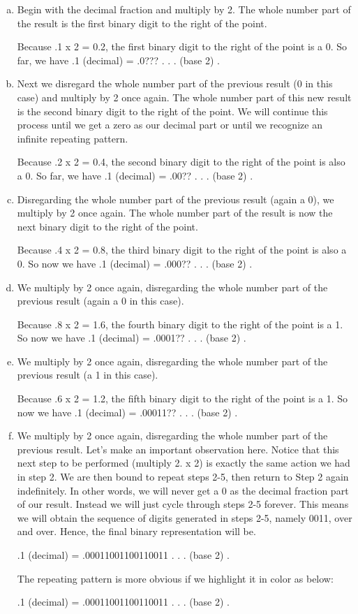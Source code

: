 \documentclass[11pt]{article}
\begin{document}
\begin{enumerate}[(a)]
\item
Begin with the decimal fraction and multiply by 2. The whole number
part of the result is the first binary digit to the right of the
point.

    Because .1 x 2 = 0.2, the first binary digit to the right of the
    point is a 0.  So far, we have .1 (decimal) = .0??? . . . (base 2)
    .

\item
Next we disregard the whole number part of the previous result (0 in
this case) and multiply by 2 once again. The whole number part of this
new result is the second binary digit to the right of the point. We
will continue this process until we get a zero as our decimal part or
until we recognize an infinite repeating pattern.

    Because .2 x 2 = 0.4, the second binary digit to the right of the point is also a 0.
    So far, we have .1 (decimal) = .00?? . . . (base 2) .

\item
Disregarding the whole number part of the previous result (again a 0),
we multiply by 2 once again. The whole number part of the result is
now the next binary digit to the right of the point.

    Because .4 x 2 = 0.8, the third binary digit to the right of the
    point is also a 0.  So now we have .1 (decimal) = .000??
    . . . (base 2) .

\item
We multiply by 2 once again, disregarding the whole number part of the
previous result (again a 0 in this case).

    Because .8 x 2 = 1.6, the fourth binary digit to the right of the
    point is a 1.  So now we have .1 (decimal) = .0001?? . . . (base
    2) .

\item
We multiply by 2 once again, disregarding the whole number part of the
previous result (a 1 in this case).

    Because .6 x 2 = 1.2, the fifth binary digit to the right of the
    point is a 1.  So now we have .1 (decimal) = .00011?? . . . (base
    2) .

\item
We multiply by 2 once again, disregarding the whole number part of the
previous result. Let's make an important observation here. Notice that
this next step to be performed (multiply 2. x 2) is exactly the same
action we had in step 2. We are then bound to repeat steps 2-5, then
return to Step 2 again indefinitely. In other words, we will never get
a 0 as the decimal fraction part of our result. Instead we will just
cycle through steps 2-5 forever. This means we will obtain the
sequence of digits generated in steps 2-5, namely 0011, over and
over. Hence, the final binary representation will be.

    .1 (decimal) = .00011001100110011 . . . (base 2) . 

The repeating pattern is more obvious if we highlight it in color as below:

    .1 (decimal) = .00011001100110011 . . . (base 2) . 
\end{enumerate}
\end{document}
